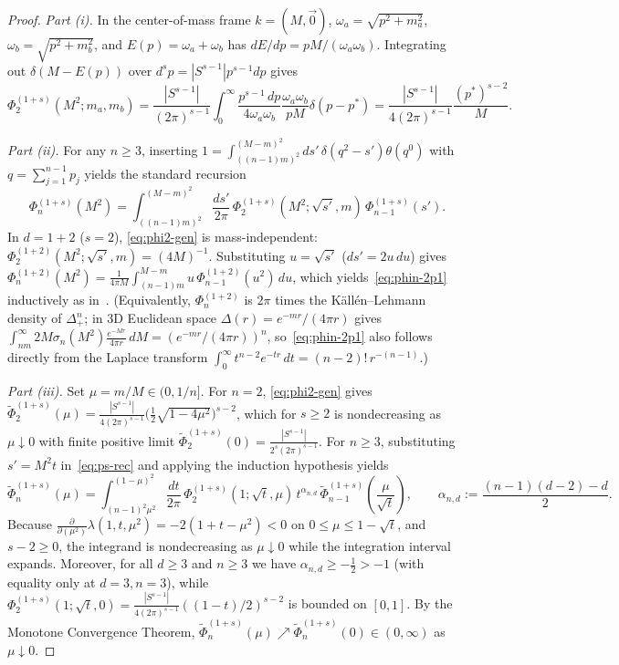 \documentclass[11pt,a4paper]{article}
\theoremstyle{definition}
\theoremstyle{remark}
\begin{document}
\begin{proof}
\emph{Part (i).} In the center-of-mass frame $k=(M,\vec{0})$, $\omega_a=\sqrt{p^2+m_a^2}$, $\omega_b=\sqrt{p^2+m_b^2}$, and $E(p)=\omega_a+\omega_b$ has $dE/dp = pM/(\omega_a\omega_b)$. Integrating out $\delta(M-E(p))$ over $d^sp=|S^{s-1}|p^{s-1}dp$ gives
\[
\Phi_2^{(1+s)}(M^2;m_a,m_b) = \frac{|S^{s-1}|}{(2\pi)^{s-1}}\int_0^\infty \frac{p^{s-1}\,dp}{4\omega_a\omega_b}\frac{\omega_a\omega_b}{pM}\delta(p-p^*) = \frac{|S^{s-1}|}{4(2\pi)^{s-1}}\frac{(p^*)^{s-2}}{M}.
\]

\emph{Part (ii).} For any $n\ge 3$, inserting $1=\int_{((n-1)m)^2}^{(M-m)^2} ds'\,\delta(q^2-s')\theta(q^0)$ with $q=\sum_{j=1}^{n-1}p_j$ yields the standard recursion
\begin{equation}\label{eq:ps-rec}
\Phi_n^{(1+s)}(M^2) = \int_{((n-1)m)^2}^{(M-m)^2} \frac{ds'}{2\pi}\,\Phi_2^{(1+s)}(M^2;\sqrt{s'},m)\,\Phi_{n-1}^{(1+s)}(s').
\end{equation}
In $d=1+2$ ($s=2$), \eqref{eq:phi2-gen} is mass-independent: $\Phi_2^{(1+2)}(M^2;\sqrt{s'},m)=(4M)^{-1}$. Substituting $u=\sqrt{s'}$ ($ds'=2u\,du$) gives $\Phi_n^{(1+2)}(M^2)=\frac{1}{4\pi M}\int_{(n-1)m}^{M-m} u\,\Phi_{n-1}^{(1+2)}(u^2)\,du$, which yields~\eqref{eq:phin-2p1} inductively as in~\cite[Eqs.~(6)--(10)]{Kaiser2025}. (Equivalently, $\Phi_n^{(1+2)}$ is $2\pi$ times the K\"all\'en--Lehmann density of $\Delta_+^n$; in $3$D Euclidean space $\Delta(r)=e^{-mr}/(4\pi r)$ gives $\int_{nm}^\infty 2M\sigma_n(M^2)\frac{e^{-Mr}}{4\pi r}\,dM = (e^{-mr}/(4\pi r))^n$, so~\eqref{eq:phin-2p1} also follows directly from the Laplace transform $\int_0^\infty t^{n-2}e^{-tr}\,dt=(n-2)!\,r^{-(n-1)}$.)

\emph{Part (iii).} Set $\mu=m/M\in(0,1/n]$. For $n=2$, \eqref{eq:phi2-gen} gives $\widetilde{\Phi}_2^{(1+s)}(\mu) = \frac{|S^{s-1}|}{4(2\pi)^{s-1}}\bigl(\frac{1}{2}\sqrt{1-4\mu^2}\bigr)^{s-2}$, which for $s\ge 2$ is nondecreasing as $\mu\downarrow 0$ with finite positive limit $\widetilde{\Phi}_2^{(1+s)}(0)=\frac{|S^{s-1}|}{2^{s}(2\pi)^{s-1}}$. For $n\ge 3$, substituting $s'=M^2 t$ in~\eqref{eq:ps-rec} and applying the induction hypothesis yields
\[
\widetilde{\Phi}_n^{(1+s)}(\mu) = \int_{(n-1)^2\mu^2}^{(1-\mu)^2} \frac{dt}{2\pi}\,\Phi_2^{(1+s)}(1;\sqrt{t},\mu)\,t^{\alpha_{n,d}}\,\widetilde{\Phi}_{n-1}^{(1+s)}\!\left(\frac{\mu}{\sqrt{t}}\right),
\qquad \alpha_{n,d} := \frac{(n-1)(d-2)-d}{2}.
\]
Because $\frac{\partial}{\partial(\mu^2)}\lambda(1,t,\mu^2) = -2(1+t-\mu^2) < 0$ on $0\le\mu\le 1-\sqrt{t}$, and $s-2\ge 0$, the integrand is nondecreasing as $\mu\downarrow 0$ while the integration interval expands. Moreover, for all $d\ge 3$ and $n\ge 3$ we have $\alpha_{n,d}\ge -\frac{1}{2}>-1$ (with equality only at $d=3,n=3$), while $\Phi_2^{(1+s)}(1;\sqrt{t},0)=\frac{|S^{s-1}|}{4(2\pi)^{s-1}}((1-t)/2)^{s-2}$ is bounded on $[0,1]$. By the Monotone Convergence Theorem, $\widetilde{\Phi}_n^{(1+s)}(\mu)\nearrow\widetilde{\Phi}_n^{(1+s)}(0)\in(0,\infty)$ as $\mu\downarrow 0$.
\end{proof}
\end{document}
